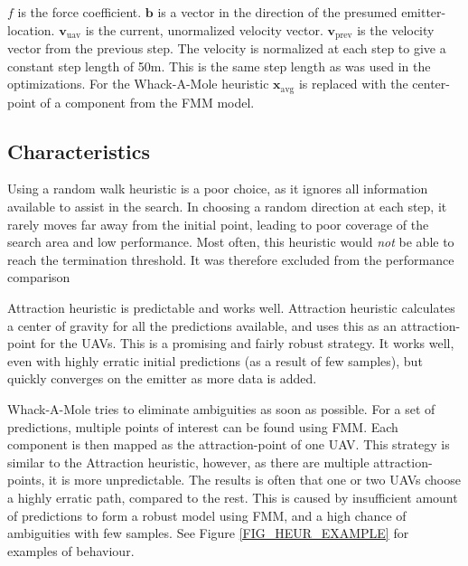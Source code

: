 \documentclass[10pt,a4paper]{book}
\begin{document}
$f$ is the force coefficient. $\boldsymbol{b}$ is a vector in the direction of the presumed emitter-location.  $\boldsymbol{v}_\text{uav}$ is the current, unormalized velocity vector. $\boldsymbol{v}_\text{prev}$ is the velocity vector from the previous step. The velocity is normalized at each step to give a constant step length of 50m. This is the same step length as was used in the optimizations. For the Whack-A-Mole heuristic $\boldsymbol{x}_\text{avg}$ is replaced with the center-point of a component from the \gls{FMM} model.


\subsection{Characteristics}

Using a random walk heuristic is a poor choice, as it ignores all information available to assist in the search. In choosing a random direction at each step, it rarely moves far away from the initial point, leading to poor coverage of the search area and low performance. Most often, this heuristic would \textit{not} be able to reach the termination threshold. It was therefore excluded from the performance comparison 

Attraction heuristic is predictable and works well. Attraction heuristic calculates a center of gravity for all the predictions available, and uses this as an attraction-point for the \glspl{UAV}. This is a promising and fairly robust strategy. It works well, even with highly erratic initial predictions (as a result of few samples), but quickly converges on the emitter as more data is added. 

Whack-A-Mole tries to eliminate ambiguities as soon as possible. For a set of predictions, multiple points of interest can be found using \gls{FMM}. Each component is then mapped as the attraction-point of one \gls{UAV}. This strategy is similar to the Attraction heuristic, however, as there are multiple attraction-points, it is more unpredictable. The results is often that one or two \glspl{UAV} choose a highly erratic path, compared to the rest. This is caused by insufficient amount of predictions to form a robust model using \gls{FMM}, and a high chance of ambiguities with few samples. See Figure \ref{FIG_HEUR_EXAMPLE} for examples of behaviour.
\end{document}
